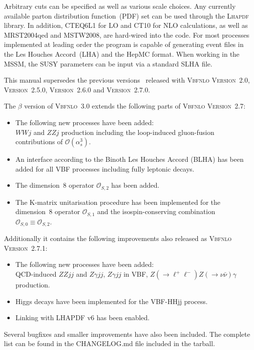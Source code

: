\documentclass[english,12pt]{article}
\begin{document}
Arbitrary cuts can be specified as well as various scale choices. Any currently
available parton distribution function~(PDF) set can be used through the
\textsc{Lhapdf} library.  In addition, 
CTEQ6L1 for LO and CT10 for NLO calculations, as well as MRST2004qed and MSTW2008, are
hard-wired into the code. For most processes implemented at leading order the
program is capable of generating event files in the Les Houches Accord~(LHA) and the 
HepMC format.  When working in the MSSM, the SUSY parameters can be input via a
standard SLHA file.

This manual supersedes the previous versions~\cite{Arnold:2008rz,Arnold:2011wj,Arnold:2011wjv2} released with
\textsc{Vbfnlo Version~2.0}, \textsc{Version~2.5.0}, \textsc{Version~2.6.0} and \textsc{Version~2.7.0}.

\noindent The $\beta$ version of \textsc{Vbfnlo~3.0} extends the following parts of \textsc{Vbfnlo Version~2.7}:
\begin{itemize}
 \item The following new processes have been added: \\
       $WWj$ and $ZZj$ production including the loop-induced gluon-fusion
       contributions of $\mathcal{O}(\alpha_s^3)$.
 \item An interface according to the Binoth Les Houches Accord
       (BLHA) has been added for all VBF processes
       including fully leptonic decays.
 \item The dimension~8 operator $\mathcal{O}_{S,2}$ has been added.
 \item The K-matrix unitarisation procedure has been implemented for the
       dimension~8 operator $\mathcal{O}_{S,1}$ and the
       isospin-conserving combination $\mathcal{O}_{S,0}\equiv\mathcal{O}_{S,2}$.
\end{itemize}
Additionally it contains the following improvements also released as \textsc{Vbfnlo Version~2.7.1}:
\begin{itemize}
 \item The following new processes have been added: \\
       QCD-induced $ZZjj$ and $Z\gamma jj$, $Z\gamma jj$ in VBF, $Z(\rightarrow \ell^+ \ell^-)Z(\rightarrow \nu \bar{\nu})\gamma$ production.
 \item Higgs decays have been implemented for the VBF-HHjj process.
 \item Linking with LHAPDF v6 has been enabled.
\end{itemize}
Several bugfixes and smaller improvements have also been included. The
complete list can be found in the CHANGELOG.md file included in the tarball.
\end{document}
